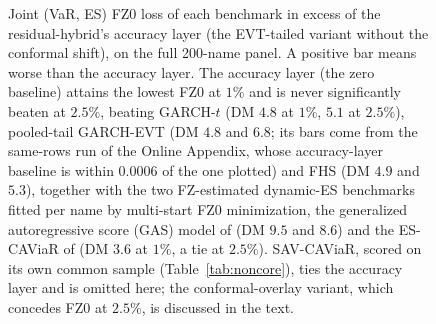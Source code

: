 \documentclass[11pt]{article}
\theoremstyle{remark}
\begin{document}
\begin{figure}[t]
\centering
{}
\caption{Joint (VaR, ES) FZ0 loss of each benchmark in excess of the
residual-hybrid's accuracy layer (the EVT-tailed variant without the
conformal shift), on the full 200-name panel. A positive bar
means worse than the accuracy layer. The accuracy layer (the zero baseline) attains the
lowest FZ0 at $1\%$ and is never significantly beaten at $2.5\%$, beating GARCH-$t$ (DM $4.8$ at
$1\%$, $5.1$ at $2.5\%$), pooled-tail GARCH-EVT (DM $4.8$ and $6.8$; its bars come from the same-rows run of the Online Appendix, whose accuracy-layer baseline is within $0.0006$ of the one plotted) and FHS (DM $4.9$ and $5.3$), together with the two
FZ-estimated dynamic-ES benchmarks fitted per name by multi-start FZ0
minimization, the generalized autoregressive score (GAS) model of \citet{patton2019} (DM $9.5$ and $8.6$) and the
ES-CAViaR of \citet{taylor2019} (DM $3.6$ at $1\%$, a tie at $2.5\%$). SAV-CAViaR, scored on its own common sample (Table~\ref{tab:noncore}), ties the accuracy layer and is omitted here; the conformal-overlay variant, which concedes FZ0 at $2.5\%$, is discussed in the text.}
\label{fig:fz0}
\end{figure}
\end{document}

